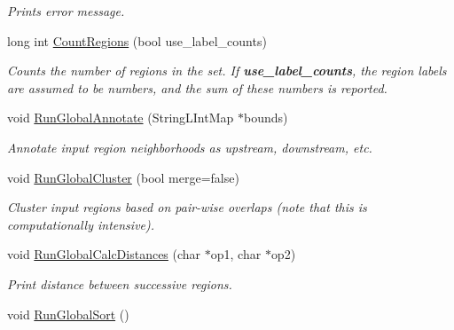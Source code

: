 \begin{CompactItemize}
\begin{CompactList}\small\item\em Prints error message. \item\end{CompactList}\item 
\hypertarget{classGenomicRegionSet_260acb32612d31325099c9e53366c9d2}{
long int \hyperlink{classGenomicRegionSet_260acb32612d31325099c9e53366c9d2}{CountRegions} (bool use\_\-label\_\-counts)}
\label{classGenomicRegionSet_260acb32612d31325099c9e53366c9d2}

\begin{CompactList}\small\item\em Counts the number of regions in the set. If {\bf use\_\-label\_\-counts}, the region labels are assumed to be numbers, and the sum of these numbers is reported. \item\end{CompactList}\item 
\hypertarget{classGenomicRegionSet_78c6f4879ac131e6db2094f21b466a98}{
void \hyperlink{classGenomicRegionSet_78c6f4879ac131e6db2094f21b466a98}{RunGlobalAnnotate} (StringLIntMap $\ast$bounds)}
\label{classGenomicRegionSet_78c6f4879ac131e6db2094f21b466a98}

\begin{CompactList}\small\item\em Annotate input region neighborhoods as upstream, downstream, etc. \item\end{CompactList}\item 
\hypertarget{classGenomicRegionSet_619b51265f7bf5d6c92144de689ca8a2}{
void \hyperlink{classGenomicRegionSet_619b51265f7bf5d6c92144de689ca8a2}{RunGlobalCluster} (bool merge=false)}
\label{classGenomicRegionSet_619b51265f7bf5d6c92144de689ca8a2}

\begin{CompactList}\small\item\em Cluster input regions based on pair-wise overlaps (note that this is computationally intensive). \item\end{CompactList}\item 
\hypertarget{classGenomicRegionSet_3d550572975732566378797ac1d8119b}{
void \hyperlink{classGenomicRegionSet_3d550572975732566378797ac1d8119b}{RunGlobalCalcDistances} (char $\ast$op1, char $\ast$op2)}
\label{classGenomicRegionSet_3d550572975732566378797ac1d8119b}

\begin{CompactList}\small\item\em Print distance between successive regions. \item\end{CompactList}\item 
\hypertarget{classGenomicRegionSet_2d6dc99608a1d4938b421fa5a85f5477}{
void \hyperlink{classGenomicRegionSet_2d6dc99608a1d4938b421fa5a85f5477}{RunGlobalSort} ()}
\label{classGenomicRegionSet_2d6dc99608a1d4938b421fa5a85f5477}


\end{CompactItemize}
